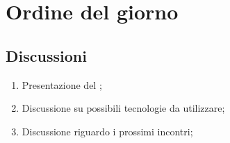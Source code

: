 \section{Ordine del giorno} 
\label{sec:agenda}
\subsection{Discussioni} 
\label{subsec:discussione}
\begin{enumerate}
    \item Presentazione del ;
    \item Discussione su possibili tecnologie da utilizzare;
    \item Discussione riguardo i prossimi incontri;
\end{enumerate}